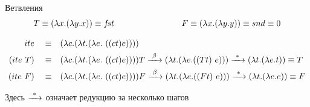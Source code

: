 \begin{frame}{Ветвления}
\def\ite{\lam{c}{\lam{t}{\lam{e}{\ \app{\app{c}{t}}{e}}}}}
\[
T\equiv(\lambda x . (\lambda y . x)) \equiv f\!st \qquad \qquad \qquad \qquad
F\equiv (\lambda x . (\lambda y . y))\equiv snd \equiv 0
\]

\begin{align*}
  ite \quad\equiv &\quad \lam{c}{\lam{t}{\lam{e}{\ \app{\app{c}{t}}{e}}}}\\
  (ite\ T) \quad\equiv &\quad \ite T \arrbeta \lam{t}{\lam{e}{ (\app{T}{t}\ e)}} \arrmany \lam{t}{\lam{e}{t}}\equiv T\\
  (ite\ F) \quad\equiv &\quad \ite F \arrbeta \lam{t}{\lam{e}{ (\app{F}{t}\ e)}} \arrmany \lam{t}{\lam{e}{e}}\equiv F
\end{align*}

Здесь $\xrightarrow{\ *\ }$ означает редукцию за несколько шагов
\end{frame}




